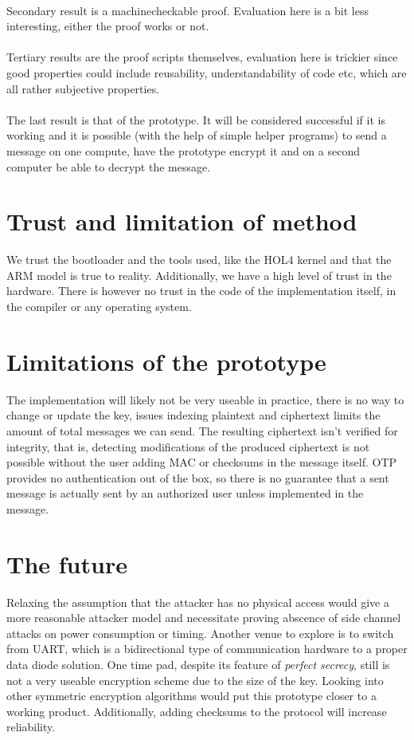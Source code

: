 \documentclass[fleqn]{kththesis}
\begin{document}
\paragraph{}
Secondary result is a machinecheckable proof. Evaluation here is a bit less interesting, either the proof works or not.
\paragraph{}
Tertiary results are the proof scripts themselves, evaluation here is trickier since good properties could include reusability, understandability of code etc, which are all rather subjective properties.
\paragraph{}
The last result is that of the prototype. It will be considered successful if it is working and it is possible (with the help of simple helper programs) to send a message on one compute, have the prototype encrypt it and on a second computer be able to decrypt the message.

\section{Trust and limitation of method}
We trust the bootloader and the tools used, like the HOL4 kernel and that the ARM model is true to reality. Additionally, we have a high level of trust in the hardware. There is however no trust in the code of the implementation itself, in the compiler or any operating system.

\section{Limitations of the prototype}
The implementation will likely not be very useable in practice, there is no way to change or update the key, issues indexing plaintext and ciphertext limits the amount of total messages we can send. The resulting ciphertext isn't verified for integrity, that is, detecting modifications of the produced ciphertext is not possible without the user adding MAC or checksums in the message itself. OTP provides no authentication out of the box, so there is no guarantee that a sent message is actually sent by an authorized user unless implemented in the message.


\section{The future}
Relaxing the assumption that the attacker has no physical access would give a more reasonable attacker model and necessitate proving abscence of side channel attacks on power consumption or timing. Another venue to explore is to switch from UART, which is a bidirectional type of communication hardware to a proper data diode solution. One time pad, despite its feature of \emph{perfect secrecy}, still is not a very useable encryption scheme due to the size of the key. Looking into other symmetric encryption algorithms would put this prototype closer to a working product. Additionally, adding checksums to the protocol will increase reliability.
\end{document}

